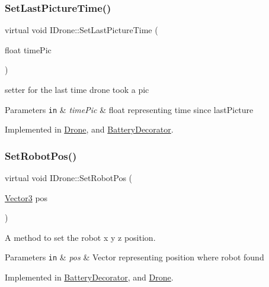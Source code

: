 \subsubsection{\texorpdfstring{Set\+Last\+Picture\+Time()}{SetLastPictureTime()}}
{\footnotesize\ttfamily virtual void I\+Drone\+::\+Set\+Last\+Picture\+Time (\begin{DoxyParamCaption}\item[{float}]{time\+Pic }\end{DoxyParamCaption})\hspace{0.3cm}{\ttfamily [pure virtual]}}



setter for the last time drone took a pic 


\begin{DoxyParams}[1]{Parameters}
\mbox{\tt in}  & {\em time\+Pic} & float representing time since last\+Picture \\
\hline
\end{DoxyParams}


Implemented in \hyperlink{classDrone_af639374e11eb02702665ba9f71697a01}{Drone}, and \hyperlink{classBatteryDecorator_abcaad479f82c6b8fcef4b511fb702d61}{Battery\+Decorator}.

\mbox{\label{classIDrone_a5851e679bf3c915e93165377cb5c8815}} 
\subsubsection{\texorpdfstring{Set\+Robot\+Pos()}{SetRobotPos()}}
{\footnotesize\ttfamily virtual void I\+Drone\+::\+Set\+Robot\+Pos (\begin{DoxyParamCaption}\item[{\hyperlink{classVector3}{Vector3}}]{pos }\end{DoxyParamCaption})\hspace{0.3cm}{\ttfamily [pure virtual]}}



A method to set the robot x y z position. 


\begin{DoxyParams}[1]{Parameters}
\mbox{\tt in}  & {\em pos} & Vector representing position where robot found \\
\hline
\end{DoxyParams}


Implemented in \hyperlink{classBatteryDecorator_a183e98816461760d499366e112e5d0a6}{Battery\+Decorator}, and \hyperlink{classDrone_a384abec1f84c15ec1c5533d9ccc8b865}{Drone}.

